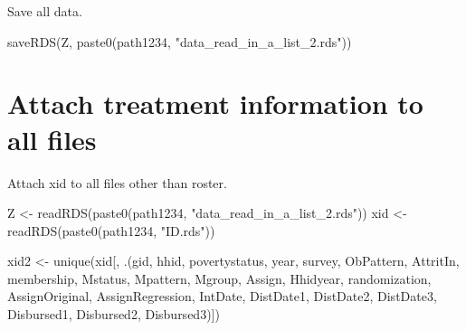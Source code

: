 Save all data.
\begin{Schunk}
\begin{Sinput}
saveRDS(Z, paste0(path1234, "data_read_in_a_list_2.rds"))
\end{Sinput}
\end{Schunk}




\section{Attach treatment information to all files}


Attach \textsf{xid} to all files other than roster.

\begin{Schunk}
\begin{Sinput}
Z <- readRDS(paste0(path1234, "data_read_in_a_list_2.rds"))
xid <- readRDS(paste0(path1234, "ID.rds"))
\end{Sinput}
\end{Schunk}

\begin{Schunk}
\begin{Sinput}
xid2 <- unique(xid[, .(gid, hhid, povertystatus, year, survey, 
	ObPattern, AttritIn,
	membership, Mstatus, Mpattern, Mgroup, Assign, Hhidyear,
   randomization, AssignOriginal, AssignRegression, 
   IntDate, DistDate1, DistDate2, DistDate3, 
   Disbursed1, Disbursed2, Disbursed3)])
\end{Sinput}
\end{Schunk}

